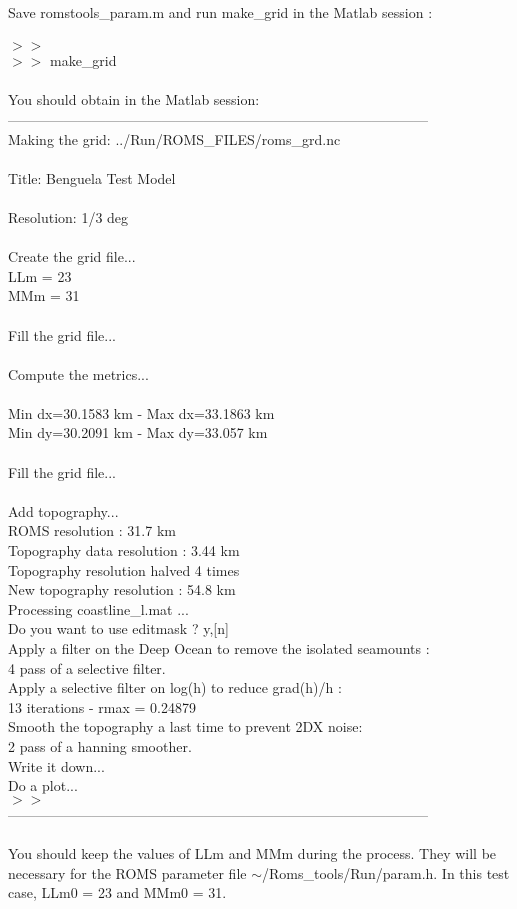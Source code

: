 Save romstools\_param.m and run make\_grid in the Matlab session :
\\ \\ 
$>>$\\
$>>$ make\_grid \\
 \\
You should obtain in the Matlab session:\\
------------------------------------------------------------------------------------------\\
Making the grid: ../Run/ROMS\_FILES/roms\_grd.nc \\
\\
Title: Benguela Test Model \\
\\
Resolution: 1/3 deg \\
\\
Create the grid file... \\
LLm = 23 \\
MMm = 31 \\
\\
Fill the grid file... \\
\\
Compute the metrics... \\
\\
Min dx=30.1583 km - Max dx=33.1863 km \\
Min dy=30.2091 km - Max dy=33.057 km \\
\\
Fill the grid file... \\
\\
Add topography... \\
  ROMS resolution : 31.7 km \\
  Topography data resolution : 3.44 km \\
  Topography resolution halved 4 times \\
   New topography resolution : 54.8 km \\
Processing coastline\_l.mat ... \\
Do you want to use editmask ? y,[n]\\
 Apply a filter on the Deep Ocean to remove the isolated seamounts :\\
   4 pass of a selective filter.\\
 Apply a selective filter on log(h) to reduce grad(h)/h :\\
   13 iterations - rmax = 0.24879\\
 Smooth the topography a last time to prevent 2DX noise:\\
   2 pass of a hanning smoother.\\
 Write it down...\\
 Do a plot...\\
 $>>$\\
 ------------------------------------------------------------------------------------------\\
\\
You should keep the values of LLm and MMm during the process.
They will be necessary for the ROMS parameter file  
$\sim$/Roms\_tools/Run/param.h. In this test case,
LLm0 = 23 and MMm0 = 31. 

